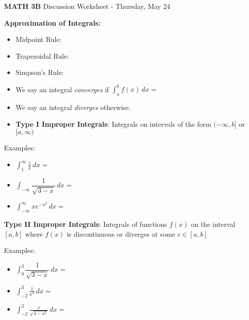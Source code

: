 \documentclass[12pt]{report}
\newcommand{\ds}{\displaystyle}
\begin{document}
\begin{center}
\textbf{{\LARGE MATH 3B}  \hfill} Discussion Worksheet - Thursday, May 24 \\
\end{center}

\noindent\textbf{Approximation of Integrals:}

\begin{itemize}

\item Midpoint Rule: 

\bigskip

\item Trapezoidal Rule:

\bigskip

\item Simpson's Rule: 

\bigskip

\end{itemize}

\begin{itemize}

\item We say an integral \emph{converges} if $\ds \int_a^b f(x) \, dx = $

\item We say an integral \emph{diverges} otherwise. 

\item \textbf{Type I Improper Integrals}: Integrals on intervals of the form $(-\infty, b]$ or $[a,\infty)$
 \end{itemize}

\noindent Examples:

\begin{itemize}

\item $\ds \int_1^\infty \frac1x \, dx = $

\item $\ds \int_{-\infty} \dfrac{1}{\sqrt{3-x}} \, dx = $

\item $\ds \int_{-\infty}^\infty x e^{-x^2}\, dx = $

\end{itemize}

\item \textbf{Type II Improper Integrals}: Integrals of functions $f(x)$ on the interval $[a,b]$ where $f(x)$ is discontinuous or diverges at some $c \in [a,b]$

\noindent Examples:

\begin{itemize}

\item $\ds \int_0^3 \dfrac{1}{\sqrt{3-x}} \, dx = $

\item $\ds \int_{-2}^3 \frac{1}{x^3} \, dx = $

\item $\ds \int_{-2}^2 \frac{x}{\sqrt{4 - x^2}} \, dx =$

\end{itemize}
\end{document}
